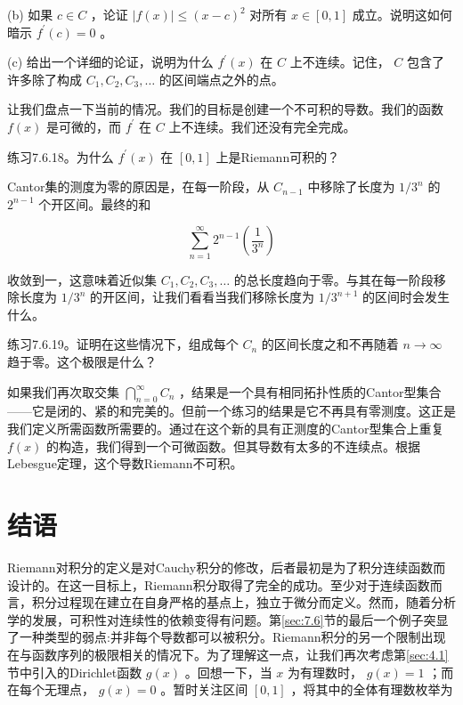 (b) 如果 \(c \in  C\) ，论证 \(\left| {f\left( x\right) }\right|  \leq  {\left( x - c\right) }^{2}\) 对所有 \(x \in  \left\lbrack  {0,1}\right\rbrack\) 成立。说明这如何暗示 \({f}^{\prime }\left( c\right)  = 0\) 。

(c) 给出一个详细的论证，说明为什么 \({f}^{\prime }\left( x\right)\) 在 \(C\) 上不连续。记住， \(C\) 包含了许多除了构成 \({C}_{1},{C}_{2},{C}_{3},\ldots\) 的区间端点之外的点。

让我们盘点一下当前的情况。我们的目标是创建一个不可积的导数。我们的函数 \(f\left( x\right)\) 是可微的，而 \({f}^{\prime }\) 在 \(C\) 上不连续。我们还没有完全完成。

练习7.6.18。为什么 \({f}^{\prime }\left( x\right)\) 在 \(\left\lbrack  {0,1}\right\rbrack\) 上是Riemann可积的？

Cantor集的测度为零的原因是，在每一阶段，从 \({C}_{n - 1}\) 中移除了长度为 \(1/{3}^{n}\) 的 \({2}^{n - 1}\) 个开区间。最终的和

\[
\mathop{\sum }\limits_{{n = 1}}^{\infty }{2}^{n - 1}\left( \frac{1}{{3}^{n}}\right)
\]

收敛到一，这意味着近似集 \({C}_{1},{C}_{2},{C}_{3},\ldots\) 的总长度趋向于零。与其在每一阶段移除长度为 \(1/{3}^{n}\) 的开区间，让我们看看当我们移除长度为 \(1/{3}^{n + 1}\) 的区间时会发生什么。

练习7.6.19。证明在这些情况下，组成每个 \({C}_{n}\) 的区间长度之和不再随着 \(n \rightarrow  \infty\) 趋于零。这个极限是什么？

如果我们再次取交集 \(\mathop{\bigcap }\limits_{{n = 0}}^{\infty }{C}_{n}\) ，结果是一个具有相同拓扑性质的Cantor型集合——它是闭的、紧的和完美的。但前一个练习的结果是它不再具有零测度。这正是我们定义所需函数所需要的。通过在这个新的具有正测度的Cantor型集合上重复 \(f\left( x\right)\) 的构造，我们得到一个可微函数。但其导数有太多的不连续点。根据Lebesgue定理，这个导数Riemann不可积。

\section{结语}
\label{sec:7.7}
Riemann对积分的定义是对Cauchy积分的修改，后者最初是为了积分连续函数而设计的。在这一目标上，Riemann积分取得了完全的成功。至少对于连续函数而言，积分过程现在建立在自身严格的基点上，独立于微分而定义。然而，随着分析学的发展，可积性对连续性的依赖变得有问题。第\ref{sec:7.6}节的最后一个例子突显了一种类型的弱点:并非每个导数都可以被积分。Riemann积分的另一个限制出现在与函数序列的极限相关的情况下。为了理解这一点，让我们再次考虑第\ref{sec:4.1}节中引入的Dirichlet函数 \(g\left( x\right)\) 。回想一下，当 \(x\) 为有理数时， \(g\left( x\right)  = 1\) ；而在每个无理点， \(g\left( x\right)  = 0\) 。暂时关注区间 \(\left\lbrack  {0,1}\right\rbrack\) ，将其中的全体有理数枚举为

